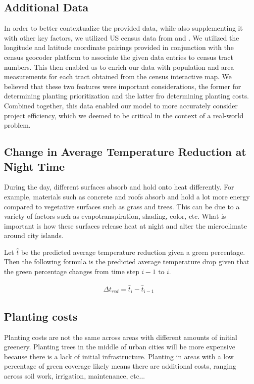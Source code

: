 \documentclass[11pt]{article}
\begin{document}
\subsection{Additional Data}
In order to better contextualize the provided data, while also supplementing it with other key factors, we utilized US census data from \cite{census_geocoder} and \cite{mtgis}. We utilized the longitude and latitude coordinate pairings provided in conjunction with the census geocoder platform to associate the given data entries to census tract numbers. This then enabled us to enrich our data with population and area measurements for each tract obtained from the census interactive map. We believed that these two features were important considerations, the former for determining planting prioritization and the latter fro determining planting costs. Combined together, this data enabled our model to more accurately consider project efficiency, which we deemed to be critical in the context of a real-world problem.


\subsection{Change in Average Temperature Reduction at Night Time}
During the day, different surfaces absorb and hold onto heat differently. For example, materials such as concrete and roofs absorb and hold a lot more energy compared to vegetative surfaces such as grass and trees. This can be due to a variety of factors such as evapotranspiration, shading, color, etc. What is important is how these surfaces release heat at night and alter the microclimate around city islands.

Let $\hat{t}$ be the predicted average temperature reduction given a green percentage. Then the following formula is the predicted average temperature drop given that the green percentage changes from time step $i-1$ to $i$.

\begin{equation}
\begin{aligned}
\Delta t_{red} =  \hat{t}_i - \hat{t}_{i-1}
\end{aligned}
\end{equation}

\subsection{Planting costs}
Planting costs are not the same across areas with different amounts of initial greenery. Planting trees in the middle of urban cities will be more expensive because there is a lack of initial infrastructure. Planting in areas with a low percentage of green coverage likely means there are additional costs, ranging across soil work, irrigation, maintenance, etc...
\end{document}
